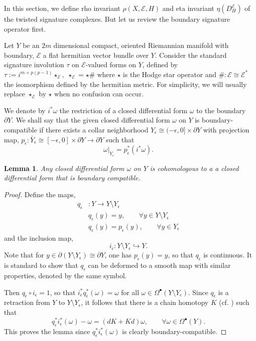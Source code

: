 \documentclass[12pt]{amsart}
\theoremstyle{plain}
\newtheorem{lemma}[theorem]{Lemma}
\theoremstyle{definition}
\theoremstyle{remark}
\begin{document}
In this section, we define rho invariant $\rho(X,{\mathcal E},H)$ and eta invariant $\eta(D^{\mathcal E}_H)$
of the twisted signature complexes. But let us review the boundary signature operator first.

{{Let $Y$ be an $2m$ dimensional compact, oriented Riemannian manifold with boundary, ${\mathcal E}$
a flat hermitian vector bundle over $Y$.  }}
 Consider the standard signature involution 
$\tau$ on ${\mathcal E}$-valued forms on $Y$, defined by $\tau:= i^{m+p(p-1)} {{\star_{\mathcal E}, \, \, \star_{\mathcal E} = \star \#}}$ where 
$\star$ is 
the Hodge star operator and $\#: {\mathcal E} \cong {\mathcal E}^*$ the isomorphism defined by the hermitian metric. {{For simplicity, we will usually replace $\star_{\mathcal E}$ by $\star$ when no confusion can occur.}}

{{ We denote by $i^*\omega$ the restriction of a closed differential form $\omega$ to the boundary $\partial Y$. We shall say that the given closed differential form 
$\omega$ on $Y$ is boundary-compatible if there exists a collar neighborhood
$Y_\epsilon\cong (-\epsilon, 0] \times \partial Y$ with projection map, 
 $p_\epsilon: \bar Y_\epsilon\cong [-\epsilon, 0] \times \partial Y \to \partial Y$ such that }}
\begin{equation}\label{bdry.compatible}
{{\omega \vert_{Y_\epsilon}  = p_\epsilon^* (i^*\omega).}}
\end{equation}

\begin{lemma}\label{lem:bdry.compatible}
Any closed differential form $\omega$ on $Y$ is cohomologous to a a closed differential form that is boundary compatible.
\end{lemma}

\begin{proof}
Define the maps,
\begin{align*}
q_\epsilon &: Y \longrightarrow Y\setminus Y_\epsilon\\
& q_\epsilon(y) = y, \qquad \forall y\in Y\setminus Y_\epsilon\\
& q_\epsilon(y) = p_\epsilon(y),  \qquad \forall y\in Y_\epsilon
\end{align*}
and the inclusion map,
$$
i_\epsilon :  Y\setminus Y_\epsilon \hookrightarrow Y.
$$
Note that for $y\in \partial(Y\setminus Y_\epsilon) \cong \partial Y$, one has $p_\epsilon(y)=y$, so that 
$q_\epsilon$ is continuous. It is standard to show that $q_\epsilon$ can be deformed to a smooth map
with similar properties, denoted by the same symbol.

Then $q_\epsilon\circ i_\epsilon =1$, so that $i_\epsilon^* q_\epsilon^*(\omega)=\omega$ for all 
$\omega \in \Omega^\bullet(Y\setminus Y_\epsilon).$ Since 
$q_\epsilon$ is a retraction from $Y$ to $Y\setminus Y_\epsilon$, it follows that
 there is a chain homotopy $K$ (cf. \cite{BoTu}) such that 
$$
q_\epsilon^*i_\epsilon^*(\omega)-\omega =(dK+Kd)\omega, \qquad \forall \omega  \in \Omega^\bullet(Y).
$$
This proves the lemma since $q_\epsilon^*i_\epsilon^*(\omega)$ is clearly boundary-compatible.
\end{proof}
\end{document}
